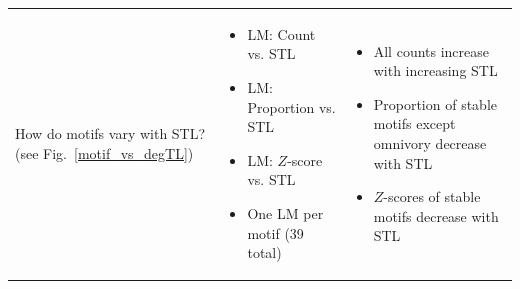 \documentclass[12pt]{article}
\begin{document}
\begin{landscape}
\begin{table}[h!]
\begin{tabular}{m{6cm}|m{7.5cm}|m{8cm}}
        How do motifs vary with STL? \newline(see Fig.~\ref{motif_vs_degTL}) & \begin{itemize} 
        \item LM: Count vs. STL 
        \item LM: Proportion vs. STL 
        \item LM: $Z$-score vs. STL
        \item One LM per motif (39 total)
        \end{itemize} &
        \begin{itemize}
            \item All counts increase with increasing STL
            \item Proportion of stable motifs except omnivory decrease with STL
            \item $Z$-scores of stable motifs decrease with STL
        \end{itemize} \\
        \end{tabular}
    \end{table}
\end{landscape}

\clearpage
\end{document}
